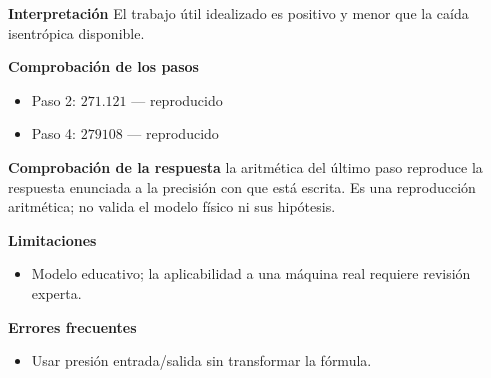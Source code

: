 \documentclass[10pt,openany]{book}
\begin{document}
\begin{tcolorbox}[title={Problema resuelto 2}, studiumworked, breakable]
\noindent\textbf{Interpretación}
El trabajo útil idealizado es positivo y menor que la caída isentrópica disponible.

\noindent\textbf{Comprobación de los pasos}
\begin{itemize}
\item Paso 2: $271.121$ — reproducido
\item Paso 4: $279108$ — reproducido
\end{itemize}

\noindent\textbf{Comprobación de la respuesta} la aritmética del último paso reproduce la respuesta enunciada a la precisión con que está escrita. Es una reproducción aritmética; no valida el modelo físico ni sus hipótesis.

\noindent\textbf{Limitaciones}
\begin{itemize}
\item Modelo educativo; la aplicabilidad a una máquina real requiere revisión experta.
\end{itemize}

\noindent\textbf{Errores frecuentes}
\begin{itemize}
\item Usar presión entrada/salida sin transformar la fórmula.
\end{itemize}
\end{tcolorbox}
\end{document}
